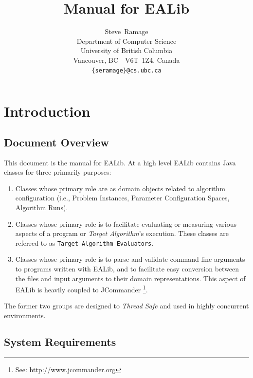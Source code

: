 \documentclass[11pt,letterpaper,oneside]{article}
\begin{document}
\title{Manual for EALib }
\author{
Steve~Ramage\\
Department of Computer Science\\
University of British Columbia\\
Vancouver, BC\ \ V6T~1Z4, Canada\\
\texttt{\{seramage\}@cs.ubc.ca}
}


\maketitle

\tableofcontents

\section{Introduction}

\subsection{Document Overview}

This document is the manual for EALib. At a high level EALib contains Java classes for three primarily purposes:

\begin{enumerate}
\item Classes whose primary role are as domain objects related to algorithm configuration (i.e., Problem Instances, Parameter Configuration Spaces, Algorithm Runs).

\item Classes whose primary role is to facilitate evaluating or measuring various aspects of a program or \emph{Target Algorithm}'s execution. These classes are referred to as \texttt{Target Algorithm Evaluators}. 

\item Classes whose primary role is to parse and validate command line arguments to programs written with EALib, and to facilitate easy conversion between the files and input arguments to their domain representations. This aspect of EALib is heavily coupled to JCommander \footnote{See: http://www.jcommander.org}.

\end{enumerate}

The former two groups are designed to \emph{Thread Safe} and used in highly concurrent environments.

\subsection{System Requirements}
\end{document}
